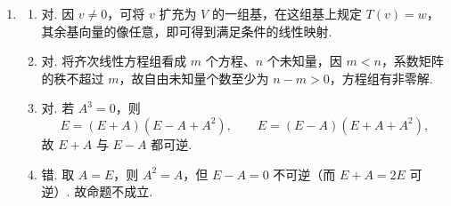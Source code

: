 \begin{enumerate}
    \item
    \begin{enumerate}
        \item 对. 因 $v\neq 0$，可将 $v$ 扩充为 $V$ 的一组基，在这组基上规定 $T(v)=w$，其余基向量的像任意，即可得到满足条件的线性映射.

        \item 对. 将齐次线性方程组看成 $m$ 个方程、$n$ 个未知量，因 $m<n$，系数矩阵的秩不超过 $m$，故自由未知量个数至少为 $n-m>0$，方程组有非零解.

        \item 对. 若 $A^3=0$，则
        \[
            E=(E+A)(E-A+A^2),\qquad
            E=(E-A)(E+A+A^2),
        \]
        故 $E+A$ 与 $E-A$ 都可逆.

        \item 错. 取 $A=E$，则 $A^2=A$，但 $E-A=0$ 不可逆（而 $E+A=2E$ 可逆）. 故命题不成立.
    \end{enumerate}
\end{enumerate}

\clearpage
